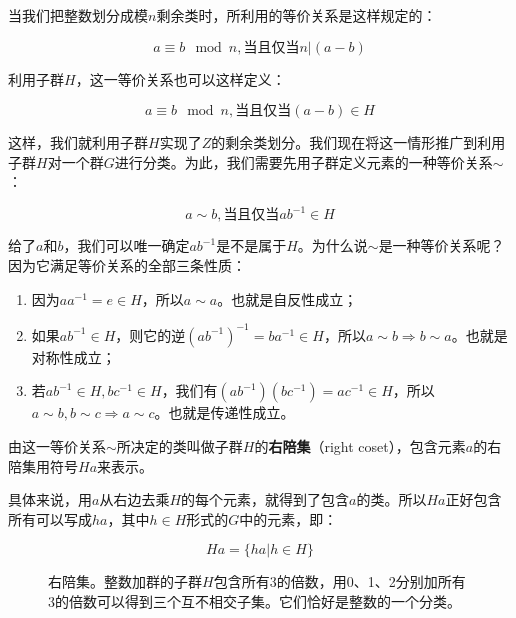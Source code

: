\documentclass[b5paper]{ctexart}
\begin{document}
当我们把整数划分成模$n$剩余类时，所利用的等价关系是这样规定的：

\[
a \equiv b \mod n, \text{当且仅当} n | (a - b)
\]

利用子群$H$，这一等价关系也可以这样定义：

\[
a \equiv b \mod n, \text{当且仅当} (a - b) \in H
\]

这样，我们就利用子群$H$实现了$Z$的剩余类划分。我们现在将这一情形推广到利用子群$H$对一个群$G$进行分类。为此，我们需要先用子群定义元素的一种等价关系$\sim$：

\[
a \sim b, \text{当且仅当} ab^{-1} \in H
\]

给了$a$和$b$，我们可以唯一确定$ab^{-1}$是不是属于$H$。为什么说$\sim$是一种等价关系呢？因为它满足等价关系的全部三条性质：

\begin{enumerate}
\item 因为$aa^{-1} = e \in H$，所以$a \sim a$。也就是自反性成立；
\item 如果$ab^{-1} \in H$，则它的逆$(ab^{-1})^{-1}= ba^{-1} \in H$，所以$a \sim b \Rightarrow b \sim a$。也就是对称性成立；
\item 若$ab^{-1} \in H, bc^{-1} \in H$，我们有$(ab^{-1})(bc^{-1}) = ac^{-1} \in H$，所以$a \sim b, b \sim c \Rightarrow a \sim c$。也就是传递性成立。
\end{enumerate}

\begin{definition}
由这一等价关系$\sim$所决定的类叫做子群$H$的\textbf{右陪集}（right coset），包含元素$a$的右陪集用符号$Ha$来表示。
\end{definition}

具体来说，用$a$从右边去乘$H$的每个元素，就得到了包含$a$的类。所以$Ha$正好包含所有可以写成$ha$，其中$h \in H$形式的$G$中的元素，即：

\[
Ha = \{ha | h \in H\}
\]

\begin{figure}[htbp]
\centering
{}
\caption{右陪集。整数加群的子群$H$包含所有3的倍数，用0、1、2分别加所有3的倍数可以得到三个互不相交子集。它们恰好是整数的一个分类。}
\label{fig:right-cosets-Z3}
\end{figure}
\end{document}

